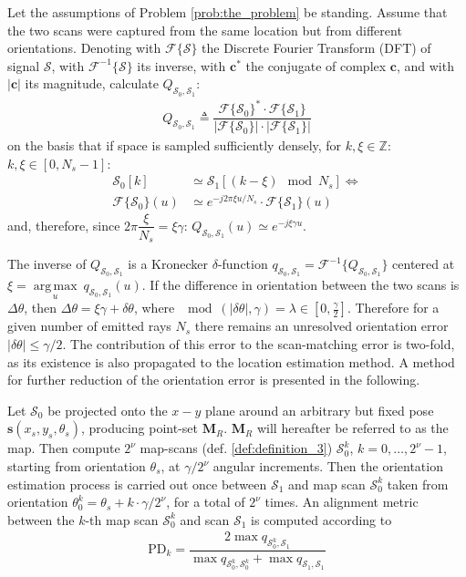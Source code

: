 Let the assumptions of Problem \ref{prob:the_problem} be standing. Assume that
the two scans were captured from the same location but from different
orientations. Denoting with $\mathcal{F}\{\mathcal{S}\}$ the Discrete Fourier
Transform (DFT) of signal $\mathcal{S}$, with $\mathcal{F}^{-1}\{\mathcal{S}\}$
its inverse, with $\bm{c}^\ast$ the conjugate of complex $\bm{c}$, and with
$|\bm{c}|$ its magnitude, calculate
$Q_{\mathcal{S}_0, \mathcal{S}_1}$:
\begin{align}
  Q_{\mathcal{S}_0, \mathcal{S}_1} \triangleq \dfrac{\mathcal{F}\{\mathcal{S}_0\}^{\ast} \cdot \mathcal{F}\{\mathcal{S}_1\}}{|\mathcal{F}\{\mathcal{S}_0\}| \cdot |\mathcal{F}\{\mathcal{S}_1\}|}
  \label{eq:Q}
\end{align}
on the basis that if space is sampled sufficiently densely, for
$k,\xi \in \mathbb{Z}$: $k,\xi \in [0, N_s-1]$:
\begin{align}
  \mathcal{S}_0[k] &\simeq \mathcal{S}_1[(k - \xi) \mod N_s] \Leftrightarrow \nonumber \\
  \mathcal{F}\{\mathcal{S}_0\}(u) &\simeq e^{-j 2\pi \xi u / N_s} \cdot \mathcal{F}\{\mathcal{S}_1\}(u) \nonumber
\end{align}
and, therefore, since $2\pi \dfrac{\xi}{N_s} = \xi \gamma$: $Q_{\mathcal{S}_0, \mathcal{S}_1}(u)  \simeq e^{-j \xi \gamma u}$.

The inverse of $Q_{\mathcal{S}_0, \mathcal{S}_1}$ is a Kronecker
$\delta$-function
$q_{\mathcal{S}_0, \mathcal{S}_1} = \mathcal{F}^{-1}\{Q_{\mathcal{S}_0, \mathcal{S}_1}\}$
centered at $\xi = \operatorname*{arg\,max}\limits_u \ q_{\mathcal{S}_0, \mathcal{S}_1}(u)$.
If the difference in orientation between the two scans is $\Delta\theta$, then
$\Delta\theta = \xi\gamma + \delta\theta$, where
$\mod(|\delta\theta|, \gamma) = \lambda \in [0,\frac{\gamma}{2}]$. Therefore for
a given number of emitted rays $N_s$ there remains an unresolved orientation
error $|\delta\theta| \leq \gamma/2$. The contribution of this error to the
scan-matching error is two-fold, as its existence is also propagated to the
location estimation method. A method for further reduction of
the orientation error is presented in the following.

Let $\mathcal{S}_0$ be projected onto the $x-y$ plane around an arbitrary but
fixed pose $\bm{s}(x_s, y_s, \theta_s)$, producing point-set $\bm{M}_R$.
$\bm{M}_R$ will hereafter be referred to as the map. Then compute $2^\nu$
map-scans (def. \ref{def:definition_3}) $\mathcal{S}_0^k$,
$k = 0,\dots,2^\nu-1$, starting from orientation $\theta_s$, at $\gamma / 2^\nu$
angular increments. Then the orientation estimation process is carried out once
between $\mathcal{S}_1$ and map scan $\mathcal{S}_0^k$ taken from orientation
$\theta_0^k = \theta_s + k \cdot \gamma / 2^\nu$, for a total of $2^\nu$ times.
An alignment metric between the $k$-th map scan $\mathcal{S}_0^k$ and scan
$\mathcal{S}_1$ is computed according to
\begin{align}
  \text{PD}_k = \dfrac{2 \max q_{\mathcal{S}_0^k,\mathcal{S}_1}}{\max q_{\mathcal{S}_0^k,\mathcal{S}_0^k} + \max q_{\mathcal{S}_1,\mathcal{S}_1}}
  \label{eq:pd}
\end{align}

